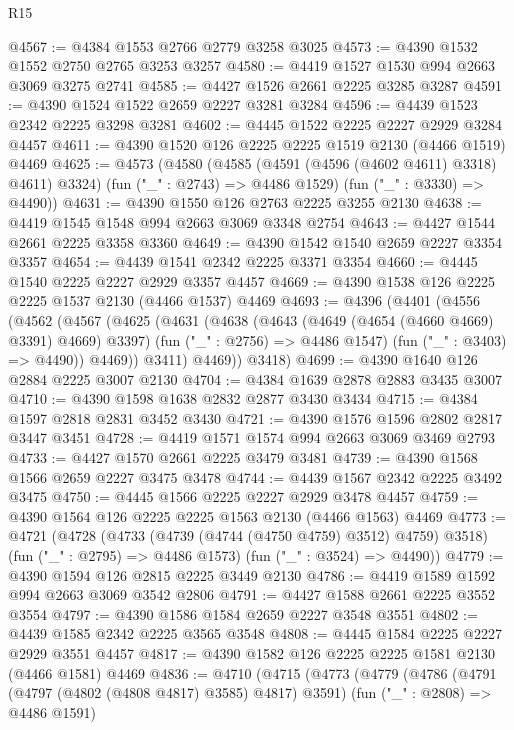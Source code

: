 \begin{lexlean}{R15}
\begin{coremodule}
@4567 := @4384 @1553 @2766 @2779 @3258 @3025
@4573 := @4390 @1532 @1552 @2750 @2765 @3253 @3257
@4580 := @4419 @1527 @1530 @994 @2663 @3069 @3275 @2741
@4585 := @4427 @1526 @2661 @2225 @3285 @3287
@4591 := @4390 @1524 @1522 @2659 @2227 @3281 @3284
@4596 := @4439 @1523 @2342 @2225 @3298 @3281
@4602 := @4445 @1522 @2225 @2227 @2929 @3284 @4457
@4611 := @4390 @1520 @126 @2225 @2225 @1519 @2130 (@4466 @1519) @4469
@4625 := @4573
    (@4580
      (@4585 (@4591 (@4596 (@4602 @4611) @3318) @4611) @3324)
      (fun ("_" : @2743) => @4486 @1529)
      (fun ("_" : @3330) => @4490))
@4631 := @4390 @1550 @126 @2763 @2225 @3255 @2130
@4638 := @4419 @1545 @1548 @994 @2663 @3069 @3348 @2754
@4643 := @4427 @1544 @2661 @2225 @3358 @3360
@4649 := @4390 @1542 @1540 @2659 @2227 @3354 @3357
@4654 := @4439 @1541 @2342 @2225 @3371 @3354
@4660 := @4445 @1540 @2225 @2227 @2929 @3357 @4457
@4669 := @4390 @1538 @126 @2225 @2225 @1537 @2130 (@4466 @1537) @4469
@4693 := @4396
    (@4401
      (@4556
        (@4562
          (@4567
            (@4625
              (@4631
                (@4638
                  (@4643 (@4649 (@4654 (@4660 @4669) @3391) @4669) @3397)
                  (fun ("_" : @2756) => @4486 @1547)
                  (fun ("_" : @3403) => @4490))
                @4469))
            @3411)
          @4469))
      @3418)
@4699 := @4390 @1640 @126 @2884 @2225 @3007 @2130
@4704 := @4384 @1639 @2878 @2883 @3435 @3007
@4710 := @4390 @1598 @1638 @2832 @2877 @3430 @3434
@4715 := @4384 @1597 @2818 @2831 @3452 @3430
@4721 := @4390 @1576 @1596 @2802 @2817 @3447 @3451
@4728 := @4419 @1571 @1574 @994 @2663 @3069 @3469 @2793
@4733 := @4427 @1570 @2661 @2225 @3479 @3481
@4739 := @4390 @1568 @1566 @2659 @2227 @3475 @3478
@4744 := @4439 @1567 @2342 @2225 @3492 @3475
@4750 := @4445 @1566 @2225 @2227 @2929 @3478 @4457
@4759 := @4390 @1564 @126 @2225 @2225 @1563 @2130 (@4466 @1563) @4469
@4773 := @4721
    (@4728
      (@4733 (@4739 (@4744 (@4750 @4759) @3512) @4759) @3518)
      (fun ("_" : @2795) => @4486 @1573)
      (fun ("_" : @3524) => @4490))
@4779 := @4390 @1594 @126 @2815 @2225 @3449 @2130
@4786 := @4419 @1589 @1592 @994 @2663 @3069 @3542 @2806
@4791 := @4427 @1588 @2661 @2225 @3552 @3554
@4797 := @4390 @1586 @1584 @2659 @2227 @3548 @3551
@4802 := @4439 @1585 @2342 @2225 @3565 @3548
@4808 := @4445 @1584 @2225 @2227 @2929 @3551 @4457
@4817 := @4390 @1582 @126 @2225 @2225 @1581 @2130 (@4466 @1581) @4469
@4836 := @4710
    (@4715
      (@4773
        (@4779
          (@4786
            (@4791 (@4797 (@4802 (@4808 @4817) @3585) @4817) @3591)
            (fun ("_" : @2808) => @4486 @1591)

\end{coremodule}
\end{lexlean}
